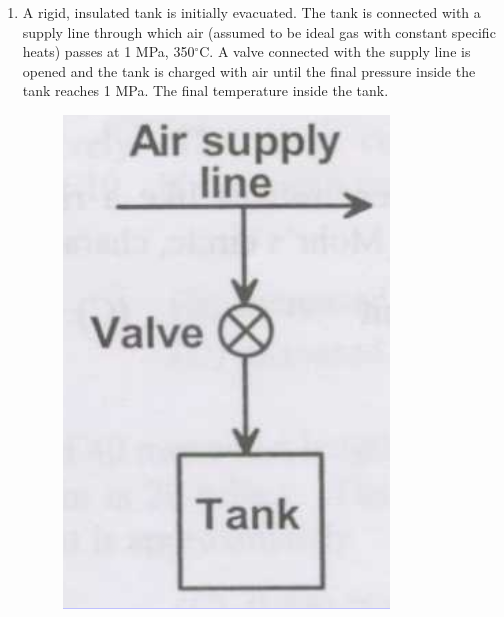 \documentclass[journal,12pt,onecolumn]{IEEEtran}
\begin{document}
\begin{enumerate}
          \begin{enumerate}
          \end{enumerate}

    \item A rigid, insulated tank is initially evacuated. The tank is connected with a supply line through which air (assumed to be ideal gas with constant specific heats) passes at 1 MPa, 350$^\circ$C. A valve connected with the supply line is opened and the tank is charged with air until the final pressure inside the tank reaches 1 MPa. The final temperature inside the tank.

          \begin{figure}[H]
              \centering
              \includegraphics[scale=0.3]{q49}
              \caption{}
              \label{q49}
          \end{figure}


\end{enumerate}
\end{document}
